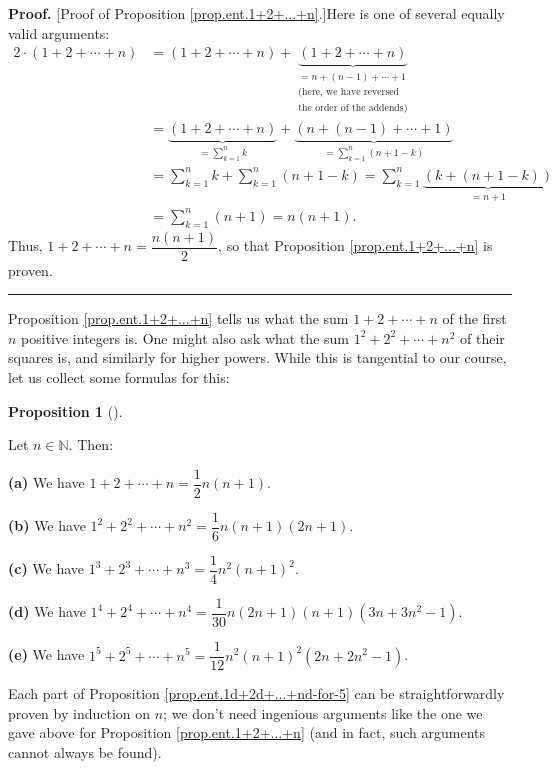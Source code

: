 \documentclass[numbers=enddot,12pt,final,onecolumn,notitlepage]{scrartcl}%
\numberwithin{exer}{subsection}
\theoremstyle{definition}
\newtheorem{prop}[theo]{Proposition}
\newenvironment{proposition}[1][]
{\begin{prop}[#1]\begin{leftbar}}
{\end{leftbar}\end{prop}}
\newenvironment{proof}[1][Proof]{\noindent\textbf{#1.} }{\ \rule{0.5em}{0.5em}}
\let\sumnonlimits\sum
\renewcommand{\sum}{\sumnonlimits\limits}
\begin{document}
\begin{proof}
[Proof of Proposition \ref{prop.ent.1+2+...+n}.]Here is one of several equally
valid arguments:%
\begin{align*}
2\cdot\left(  1+2+\cdots+n\right)   &  =\left(  1+2+\cdots+n\right)
+\underbrace{\left(  1+2+\cdots+n\right)  }_{\substack{=n+\left(  n-1\right)
+\cdots+1\\\text{(here, we have reversed}\\\text{the order of the addends)}%
}}\\
&  =\underbrace{\left(  1+2+\cdots+n\right)  }_{=\sum_{k=1}^{n}k}%
+\underbrace{\left(  n+\left(  n-1\right)  +\cdots+1\right)  }_{=\sum
_{k=1}^{n}\left(  n+1-k\right)  }\\
&  =\sum_{k=1}^{n}k+\sum_{k=1}^{n}\left(  n+1-k\right)  =\sum_{k=1}%
^{n}\underbrace{\left(  k+\left(  n+1-k\right)  \right)  }_{=n+1}\\
&  =\sum_{k=1}^{n}\left(  n+1\right)  =n\left(  n+1\right)  .
\end{align*}
Thus, $1+2+\cdots+n=\dfrac{n\left(  n+1\right)  }{2}$, so that Proposition
\ref{prop.ent.1+2+...+n} is proven.
\end{proof}

Proposition \ref{prop.ent.1+2+...+n} tells us what the sum $1+2+\cdots+n$ of
the first $n$ positive integers is. One might also ask what the sum
$1^{2}+2^{2}+\cdots+n^{2}$ of their squares is, and similarly for higher
powers. While this is tangential to our course, let us collect some formulas
for this:

\begin{proposition}
\label{prop.ent.1d+2d+...+nd-for-5}Let $n\in\mathbb{N}$. Then:

\textbf{(a)} We have $1+2+\cdots+n=\dfrac{1}{2}n\left(  n+1\right)  $.

\textbf{(b)} We have $1^{2}+2^{2}+\cdots+n^{2}=\dfrac{1}{6}n\left(
n+1\right)  \left(  2n+1\right)  $.

\textbf{(c)} We have $1^{3}+2^{3}+\cdots+n^{3}=\dfrac{1}{4}n^{2}\left(
n+1\right)  ^{2}$.

\textbf{(d)} We have $1^{4}+2^{4}+\cdots+n^{4}=\dfrac{1}{30}n\left(
2n+1\right)  \left(  n+1\right)  \left(  3n+3n^{2}-1\right)  $.

\textbf{(e)} We have $1^{5}+2^{5}+\cdots+n^{5}=\dfrac{1}{12}n^{2}\left(
n+1\right)  ^{2}\left(  2n+2n^{2}-1\right)  $.
\end{proposition}

Each part of Proposition \ref{prop.ent.1d+2d+...+nd-for-5} can be
straightforwardly proven by induction on $n$; we don't need ingenious
arguments like the one we gave above for Proposition \ref{prop.ent.1+2+...+n}
(and in fact, such arguments cannot always be found).
\end{document}
